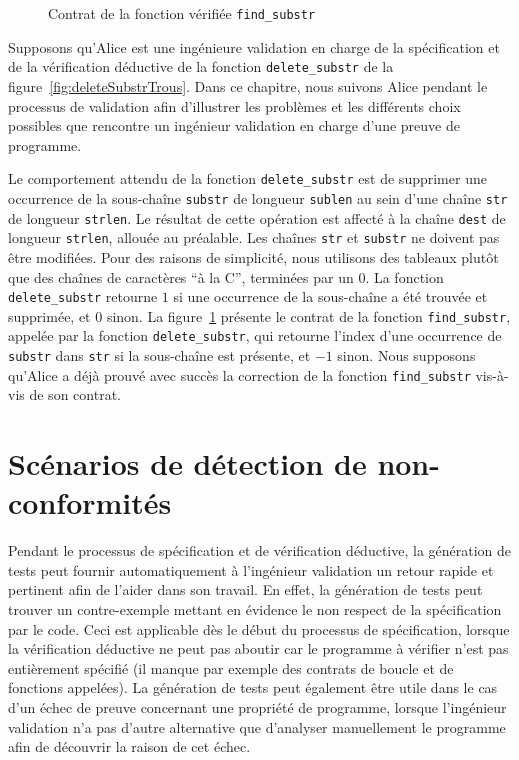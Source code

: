\begin{figure}[t]
  
  \vspace{-3mm}
  \caption{Contrat \eacsl de la fonction vérifiée \lstinline{find_substr}}
  \vspace{-3mm}
  \label{fig:findSubstr}
\end{figure}

Supposons qu'Alice est une ingénieure validation en charge de la spécification
et de la vérification déductive de la fonction \lstinline{delete_substr} de la
figure~\ref{fig:deleteSubstrTrous}.
Dans ce chapitre, nous suivons Alice pendant le processus de validation afin
d'illustrer les problèmes et les différents choix possibles que rencontre un
ingénieur validation en charge d'une preuve de programme.

Le comportement attendu de la fonction \lstinline{delete_substr} est de
supprimer une occurrence de la sous-chaîne \lstinline{substr} de longueur
\lstinline{sublen} au sein d'une chaîne \lstinline{str} de longueur
\lstinline{strlen}.
Le résultat de cette opération est affecté à la chaîne \lstinline{dest} de
longueur \lstinline'strlen', allouée au préalable.
Les chaînes \lstinline{str} et \lstinline{substr} ne doivent pas être modifiées.
Pour des raisons de simplicité, nous utilisons des tableaux plutôt que des
chaînes de caractères ``à la C'', terminées par un 0.
La fonction \lstinline{delete_substr} retourne $1$ si une occurrence de la
sous-chaîne a été trouvée et supprimée, et $0$ sinon.
La figure~\ref{fig:findSubstr} présente le contrat de la fonction
\lstinline{find_substr}, appelée par la fonction \lstinline{delete_substr}, qui
retourne l'index d'une occurrence de \lstinline{substr} dans \lstinline{str} si
la sous-chaîne est présente, et $-1$ sinon.
Nous supposons qu'Alice a déjà prouvé avec succès la correction de la fonction
\lstinline{find_substr} vis-à-vis de son contrat.


\section{Scénarios de détection de non-conformités}
\label{sec:ncd-scenarios}


Pendant le processus de spécification et de vérification déductive, la
génération de tests peut fournir automatiquement à l'ingénieur validation un
retour rapide et pertinent afin de l'aider dans son travail.
En effet, la génération de tests peut trouver un contre-exemple mettant en
évidence le non respect de la spécification par le code.
Ceci est applicable dès le début du processus de spécification, lorsque la
vérification déductive ne peut pas aboutir car le programme à vérifier n'est
pas entièrement spécifié (il manque par exemple des contrats de boucle et de
fonctions appelées).
La génération de tests peut également être utile dans le cas d'un échec de
preuve concernant une propriété de programme, lorsque l'ingénieur validation
n'a pas d'autre alternative que d'analyser manuellement le programme afin de
découvrir la raison de cet échec.

